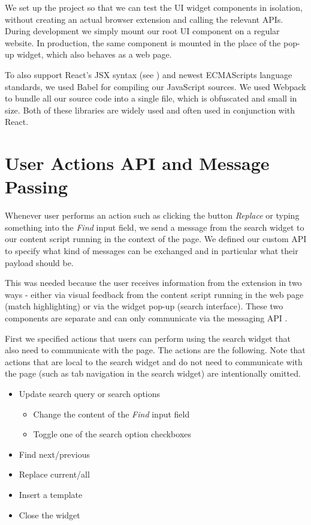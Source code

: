 \documentclass[bsc,frontabs,twoside,singlespacing,parskip,deptreport]{infthesis}
\providecommand{\tightlist}{%
  \setlength{\itemsep}{0pt}\setlength{\parskip}{0pt}}
\begin{document}
We set up the project so that we can test the UI widget components in isolation, without creating an actual browser extension and calling the relevant APIs. During development we simply mount our root UI component on a regular website. In production, the same component is mounted in the place of the pop-up widget, which also behaves as a web page.

To also support React's JSX syntax (see \cite{A5}) and newest ECMAScripts language standards, we used Babel \cite{A6} for compiling our JavaScript sources. We used Webpack \cite{A7} to bundle all our source code into a single file, which is obfuscated and small in size. Both of these libraries are widely used and often used in conjunction with React.

\section{User Actions API and Message Passing}
Whenever user performs an action such as clicking the button \textit{Replace} or typing something into the \textit{Find} input field, we send a message from the search widget to our content script running in the context of the page. We defined our custom API to specify what kind of messages can be exchanged and in particular what their payload should be.

This was needed because the user receives information from the extension in two ways - either via visual feedback from the content script running in the web page (match highlighting) or via the widget pop-up (search interface). These two components are separate and can only communicate via the messaging API \cite{C5}.

First we specified actions that users can perform using the search widget that also need to communicate with the page. The actions are the following. Note that actions that are local to the search widget and do not need to communicate with the page (such as tab navigation in the search widget) are intentionally omitted.

\begin{itemize}
\tightlist
\item
  Update search query or search options
  \begin{itemize}
  \tightlist
  \item
    Change the content of the \textit{Find} input field
  \item
    Toggle one of the search option checkboxes
  \end{itemize}
\item
  Find next/previous
\item
  Replace current/all
\item
  Insert a template
\item
  Close the widget
\end{itemize}
\end{document}
